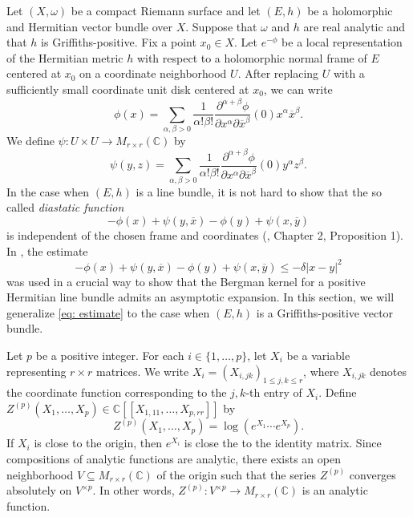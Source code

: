 \documentclass{amsart}
\theoremstyle{definition}
\theoremstyle{remark}
\numberwithin{equation}{section}
\begin{document}
Let $(X,\omega)$ be a compact Riemann surface and let $(E,h)$ be a holomorphic and Hermitian vector bundle over $X$. Suppose that $\omega$ and $h$ are real analytic and that $h$ is Griffiths-positive. Fix a point $x_0 \in X$. Let $e^{-\phi}$ be a local representation of the Hermitian metric $h$ with respect to a holomorphic normal frame of $E$ centered at $x_0$ on a coordinate neighborhood $U$. After replacing $U$ with a sufficiently small coordinate unit disk centered at $x_0$, we can write
$$
\phi(x) = \sum_{\alpha,\beta > 0} \frac{1}{\alpha! \beta!} \frac{\partial^{\alpha + \beta} \phi}{\partial x^\alpha \partial \overline{x}^\beta} (0) x^\alpha \overline{x}^\beta.
$$
We define $\psi : U \times U \to M_{r \times r}(\mathbb{C})$ by
\begin{equation} \label{eq : psi}
\psi(y,z) =  \sum_{\alpha,\beta > 0} \frac{1}{\alpha!\beta!} 
 \frac{\partial^{\alpha + \beta} \phi}{\partial x^\alpha \partial \overline{x}^\beta} (0) y^\alpha z^\beta.
\end{equation}
In the case when $(E,h)$ is a line bundle, it is not hard to show that the so called \emph{diastatic function} 
\begin{equation} \label{eq: diastatic}
-\phi(x) + \psi(y,\overline{x}) - \phi(y) + \psi(x,\overline{y}) 
\end{equation}
is independent of the chosen frame and coordinates (\cite{C}, Chapter 2, Proposition 1). In \cite{BBS}, the estimate
\begin{equation} \label{eq: estimate}
-\phi(x) + \psi(y,\overline{x}) - \phi(y) + \psi(x,\overline{y})  \leq -\delta|x-y|^2 
\end{equation}
was used in a crucial way to show that the Bergman kernel for a positive Hermitian line bundle admits an asymptotic expansion. In this section, we will generalize \eqref{eq: estimate} to the case when $(E,h)$ is a Griffiths-positive vector bundle.



Let $p$ be a positive integer. For each $i \in \{1, \dotsc, p\}$, let $X_i$ be a variable representing $r \times r$ matrices. We write $X_i = (X_{i,jk})_{1\leq j,k \leq r}$, where $X_{i,jk}$ denotes the coordinate function corresponding to the $j,k$-th entry of $X_i$. Define $Z^{(p)}(X_1, \dotsc, X_p) \in \mathbb{C} [[X_{1,11}, \dotsc, X_{p,rr}]]$ by 
\begin{equation}
    Z^{(p)}(X_1, \dotsc, X_p) = \log \left ( e^{X_1} \dotsb e^{X_p} \right ).
\end{equation}
If $X_i$ is close to the origin, then $e^{X_i}$ is close the to the identity matrix. Since compositions of analytic functions are analytic, there exists an open neighborhood $V \subseteq M_{r \times r} (\mathbb{C})$ of the origin such that the series $Z^{(p)}$ converges absolutely on $V^{\times p}$. In other words, $Z^{(p)} : V^{\times p} \to M_{r \times r}(\mathbb{C})$ is an analytic function.
\end{document}
